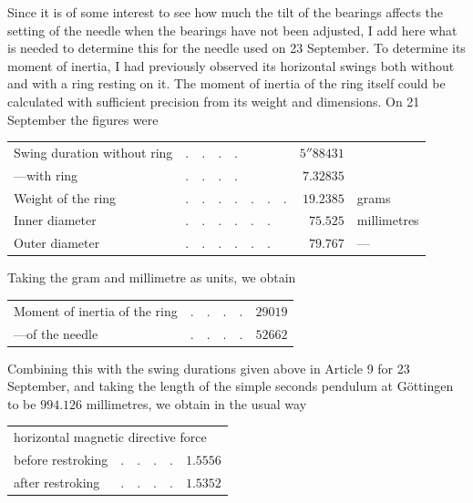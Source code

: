 Since it is of some interest to see how much the tilt of the bearings affects the setting of the needle when the bearings have not been adjusted, I add here what is needed to determine this for the needle used on 23 September. To determine its moment of inertia, I had previously observed its horizontal swings both without and with a ring resting on it. The moment of inertia of the ring itself could be calculated with sufficient precision from its weight and dimensions. On 21 September the figures were
\begin{center}
{\fontsize{9}{11}\selectfont
\begin{tabular}{llrl}
Swing duration without ring&$.\quad.\quad.\quad.$&$5''88431$&\\
\hspace{2em}---\quad with ring&$.\quad.\quad.\quad.$&$7.32835$&\\
Weight of the ring&$.\quad.\quad.\quad.\quad.\quad.\quad.$&$19.2385$&grams\\
Inner diameter&$.\quad.\quad.\quad.\quad.\quad.$&$75.525$&millimetres\\
Outer diameter&$.\quad.\quad.\quad.\quad.\quad.$&$79.767$&---
\end{tabular}}
\end{center}

Taking the gram and millimetre as units, we obtain
\begin{center}
\begin{tabular}{llr}
Moment of inertia of the ring&$.\quad.\quad.\quad.$&$29019$\\
\hspace{2em}---\quad of the needle\footnotemark&$.\quad.\quad.\quad.$&$52662$
\end{tabular}
\end{center}


Combining this with the swing durations given above in Article 9 for 23 September, and taking the length of the simple seconds pendulum at Göttingen to be $994.126$ millimetres, we obtain in the usual way
\begin{center}
\begin{tabular}{llr}
\multicolumn{3}{l}{horizontal magnetic directive force}\\
\quad before restroking&$.\quad.\quad.\quad.$&$1.5556$\\
\quad after restroking&$.\quad.\quad.\quad.$&$1.5352$
\end{tabular}
\end{center}

